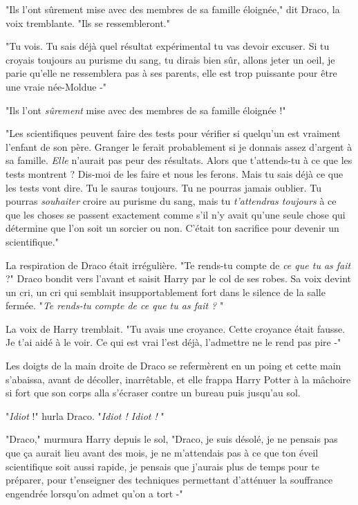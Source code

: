 "Ils l'ont sûrement mise avec des membres de sa famille éloignée," dit Draco, la voix tremblante. "Ils se ressembleront."

"Tu vois. Tu sais déjà quel résultat expérimental tu vas devoir excuser. Si tu croyais toujours au purisme du sang, tu dirais bien sûr, allons jeter un oeil, je parie qu'elle ne ressemblera pas à ses parents, elle est trop puissante pour être une vraie née-Moldue -"

"Ils l'ont \emph{sûrement } mise avec des membres de sa famille éloignée !"

"Les scientifiques peuvent faire des tests pour vérifier si quelqu'un est vraiment l'enfant de son père. Granger le ferait probablement si je donnais assez d'argent à sa famille. \emph{Elle}  n'aurait pas peur des résultats. Alors que t'attends-tu à ce que les tests montrent ? Dis-moi de les faire et nous les ferons. Mais tu sais déjà ce que les tests vont dire. Tu le sauras toujours. Tu ne pourras jamais oublier. Tu pourras \emph{souhaiter}  croire au purisme du sang, mais tu \emph{t'attendras toujours } à ce que les choses se passent exactement comme s'il n'y avait qu'une seule chose qui détermine que l'on soit un sorcier ou non. C'était ton sacrifice pour devenir un scientifique."

La respiration de Draco était irrégulière. "Te rends-tu compte de \emph{ce que tu as fait}  ?" Draco bondit vers l'avant et saisit Harry par le col de ses robes. Sa voix devint un cri, un cri qui semblait insupportablement fort dans le silence de la salle fermée. "\emph{Te rends-tu compte de ce que tu as fait ?} "

La voix de Harry tremblait. "Tu avais une croyance. Cette croyance était fausse. Je t'ai aidé à le voir. Ce qui est vrai l'est déjà, l'admettre ne le rend pas pire -"

Les doigts de la main droite de Draco se refermèrent en un poing et cette main s'abaissa, avant de décoller, inarrêtable, et elle frappa Harry Potter à la mâchoire si fort que son corps alla s'écraser contre un bureau puis jusqu'au sol.

"\emph{Idiot}  !" hurla Draco. "\emph{Idiot ! Idiot !} "

"Draco," murmura Harry depuis le sol, "Draco, je suis désolé, je ne pensais pas que ça aurait lieu avant des mois, je ne m'attendais pas à ce que ton éveil scientifique soit aussi rapide, je pensais que j'aurais plus de temps pour te préparer, pour t'enseigner des techniques permettant d'atténuer la souffrance engendrée lorsqu'on admet qu'on a tort -"

